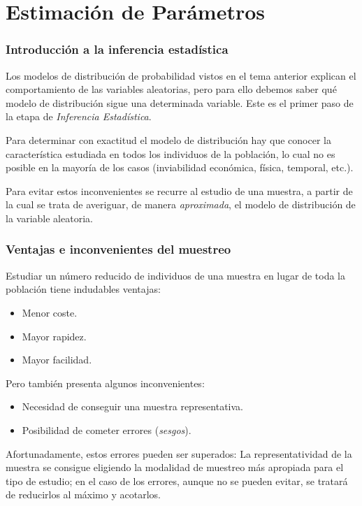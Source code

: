 \section{Estimación de Parámetros}



\begin{frame}
\frametitle{Introducción a la inferencia estadística}
Los modelos de distribución de probabilidad vistos en el tema anterior explican el comportamiento de las variables aleatorias, pero para ello debemos saber qué modelo de distribución sigue una determinada variable.
Este es el primer paso de la etapa de \emph{Inferencia Estadística}. 
 
Para determinar con exactitud el modelo de distribución hay que conocer la característica estudiada en todos los individuos de la población, lo cual no es posible en la mayoría de los casos (inviabilidad económica, física, temporal, etc.).
 
Para evitar estos inconvenientes se recurre al estudio de una muestra, a partir de la cual se trata de averiguar, de manera \emph{aproximada}, el modelo de distribución de la variable aleatoria.
\end{frame}


\begin{frame}
\frametitle{Ventajas e inconvenientes del muestreo}
Estudiar un número reducido de individuos de una muestra en lugar de toda la población tiene indudables ventajas:
\begin{itemize}
\item Menor coste.
\item Mayor rapidez.
\item Mayor facilidad. 
\end{itemize}

Pero también presenta algunos inconvenientes:
\begin{itemize}
\item Necesidad de conseguir una muestra representativa.
\item Posibilidad de cometer errores (\emph{sesgos}).
\end{itemize}

Afortunadamente, estos errores pueden ser superados: La representatividad de la muestra se consigue eligiendo la modalidad de muestreo más apropiada para el tipo de estudio; en el caso de los errores, aunque no se pueden evitar, se tratará de reducirlos al máximo y acotarlos.
\end{frame}


